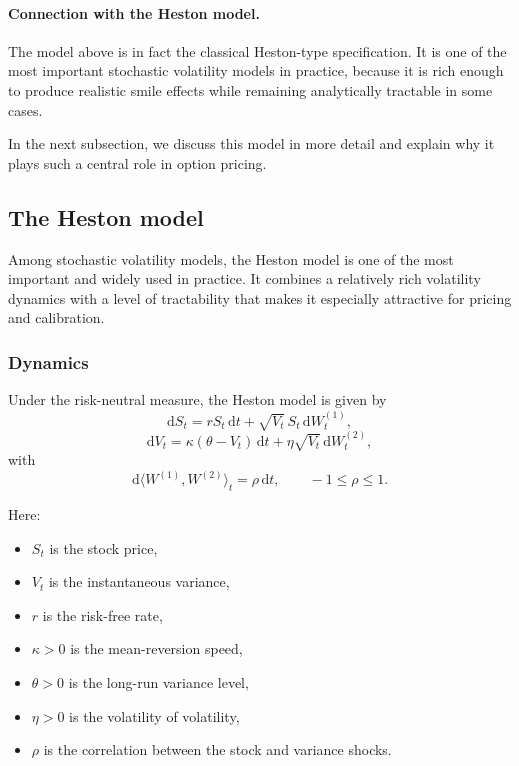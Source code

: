 \documentclass[11pt]{article}
\theoremstyle{plain}
\theoremstyle{definition}
\theoremstyle{remark}
\begin{document}
\paragraph{Connection with the Heston model.}
The model above is in fact the classical Heston-type specification.
It is one of the most important stochastic volatility models in
practice, because it is rich enough to produce realistic smile effects
while remaining analytically tractable in some cases.

In the next subsection, we discuss this model in more detail and explain
why it plays such a central role in option pricing.

\subsection{The Heston model}

Among stochastic volatility models, the Heston model is one of the most
important and widely used in practice.
It combines a relatively rich volatility dynamics with a level of
tractability that makes it especially attractive for pricing and
calibration.

\subsubsection{Dynamics}

Under the risk-neutral measure, the Heston model is given by
\[
\mathrm{d}S_t
=
rS_t\,\mathrm{d}t
+
\sqrt{V_t}\,S_t\,\mathrm{d}W_t^{(1)},
\]
\[
\mathrm{d}V_t
=
\kappa(\theta-V_t)\,\mathrm{d}t
+
\eta\sqrt{V_t}\,\mathrm{d}W_t^{(2)},
\]
with
\[
\mathrm{d}\langle W^{(1)},W^{(2)}\rangle_t=\rho\,\mathrm{d}t,
\qquad -1\le \rho\le 1.
\]

Here:
\begin{itemize}[leftmargin=1.4em]
    \item \(S_t\) is the stock price,
    \item \(V_t\) is the instantaneous variance,
    \item \(r\) is the risk-free rate,
    \item \(\kappa>0\) is the mean-reversion speed,
    \item \(\theta>0\) is the long-run variance level,
    \item \(\eta>0\) is the volatility of volatility,
    \item \(\rho\) is the correlation between the stock and variance shocks.
\end{itemize}
\end{document}
